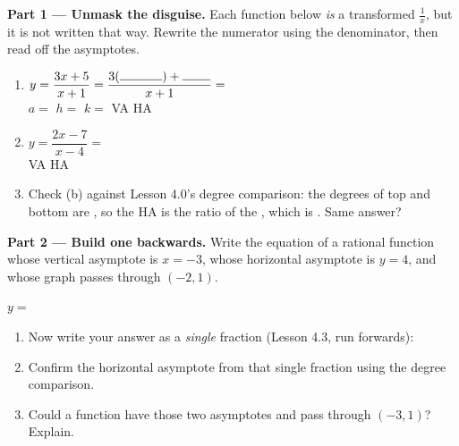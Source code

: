\documentclass[10pt]{article}
\begin{document}
\begin{tcolorbox}[colback=white, colframe=black!40, title=\textbf{Tier E --- Extension},
    fonttitle=\bfseries, arc=1.5mm, left=3mm, right=3mm, top=2mm, bottom=2mm, breakable]
\textbf{Part 1 --- Unmask the disguise.} Each function below \emph{is} a transformed $\frac1x$, but it is
not written that way. Rewrite the numerator using the denominator, then read off the asymptotes.
\begin{enumerate}[label=(\alph*), leftmargin=1.9em, itemsep=8pt]
  \item $y=\dfrac{3x+5}{x+1}=\dfrac{3(\rule{1.2cm}{0.4pt})+\rule{0.8cm}{0.4pt}}{x+1}=$ \blank{2.6cm}
        \\[3pt]
        $a=$ \blank{0.8cm} \quad $h=$ \blank{0.8cm} \quad $k=$ \blank{0.8cm} \quad
        VA \blank{1.2cm} \quad HA \blank{1.2cm}
  \item $y=\dfrac{2x-7}{x-4}=$ \blank{2.6cm} \\[3pt]
        VA \blank{1.2cm} \quad HA \blank{1.2cm}
  \item Check (b) against Lesson 4.0's degree comparison: the degrees of top and bottom are
        \blank{1.4cm}, so the HA is the ratio of the \blank{3.2cm}, which is \blank{1.0cm}. Same
        answer? \blank{0.9cm}
\end{enumerate}

\vspace{5pt}
\textbf{Part 2 --- Build one backwards.} Write the equation of a rational function whose vertical
asymptote is $x=-3$, whose horizontal asymptote is $y=4$, and whose graph passes through $(-2,1)$.
\begin{center}
$y=$ \blank{4.0cm}
\end{center}
\begin{enumerate}[label=(\alph*), leftmargin=1.9em, itemsep=5pt]
  \item Now write your answer as a \emph{single} fraction (Lesson 4.3, run forwards): \blank{3.0cm}
  \item Confirm the horizontal asymptote from that single fraction using the degree comparison.
        \blank{4.4cm}
  \item Could a function have those two asymptotes and pass through $(-3,1)$? Explain.
        \writeline
\end{enumerate}


\end{tcolorbox}
\end{document}
